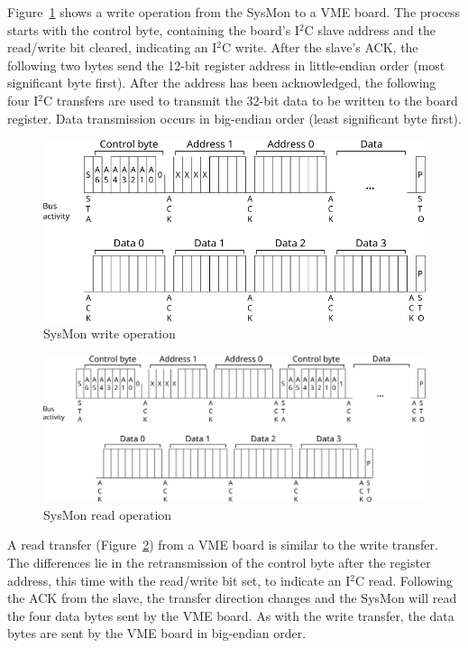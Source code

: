\documentclass[a4paper,11pt]{article}
\begin{document}
Figure~\ref{fig:sysmon-wr} shows a write operation from the SysMon to a VME
board. The process starts with the control byte, containing the board's
I$^2$C slave address and the read/write bit cleared, indicating an 
I$^2$C write. After the slave's ACK, the following two bytes send the 
12-bit register address in little-endian order (most significant byte first). 
After the address has been acknowledged, the following four I$^2$C transfers 
are used to transmit the 32-bit data to be written to the board register.
Data transmission occurs in big-endian order (least significant byte first).

\begin{figure}[h]
  \centerline{\includegraphics[width=.9\textwidth]{fig/sysmon-wr}}
  \caption{SysMon write operation}
  \label{fig:sysmon-wr}
\end{figure}

\begin{figure}[h]
  \centerline{\includegraphics[width=\textwidth]{fig/sysmon-rd}}
  \caption{SysMon read operation}
  \label{fig:sysmon-rd}
\end{figure}

A read transfer (Figure~\ref{fig:sysmon-rd}) from a VME board is similar 
to the write transfer. The differences lie in the retransmission of the
control byte after the register address, this time with the read/write
bit set, to indicate an I$^2$C read. Following the ACK from the slave,
the transfer direction changes and the SysMon will read the four data
bytes sent by the VME board. As with the write transfer, the data bytes
are sent by the VME board in big-endian order.
\end{document}
